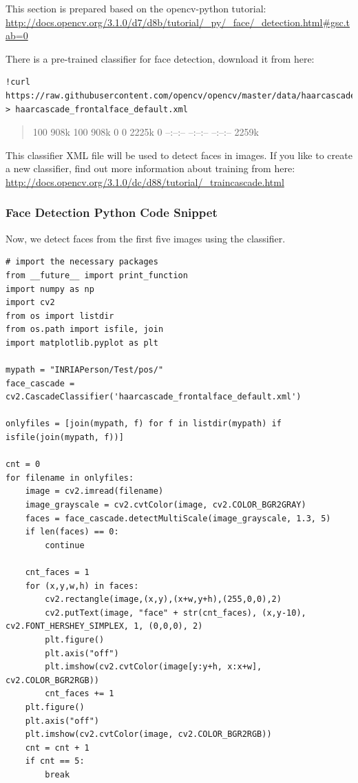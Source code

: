 This section is prepared based on the opencv-python tutorial:
\url{http://docs.opencv.org/3.1.0/d7/d8b/tutorial/_py/_face/_detection.html\#gsc.tab=0}

There is a pre-trained classifier for face detection, download it from
here:

\begin{verbatim}
!curl https://raw.githubusercontent.com/opencv/opencv/master/data/haarcascades/haarcascade_frontalface_default.xml > haarcascade_frontalface_default.xml
\end{verbatim}

\begin{quote}
100 908k 100 908k 0 0 2225k 0 --:--:-- --:--:-- --:--:-- 2259k
\end{quote}

This classifier XML file will be used to detect faces in images. If you
like to create a new classifier, find out more information about
training from here:
\url{http://docs.opencv.org/3.1.0/dc/d88/tutorial/_traincascade.html}

\subsubsection{Face Detection Python Code
Snippet}\label{face-detection-python-code-snippet}

Now, we detect faces from the first five images using the classifier.

\begin{verbatim}
# import the necessary packages
from __future__ import print_function
import numpy as np
import cv2
from os import listdir
from os.path import isfile, join
import matplotlib.pyplot as plt

mypath = "INRIAPerson/Test/pos/"
face_cascade = cv2.CascadeClassifier('haarcascade_frontalface_default.xml')

onlyfiles = [join(mypath, f) for f in listdir(mypath) if isfile(join(mypath, f))]

cnt = 0
for filename in onlyfiles:
    image = cv2.imread(filename)
    image_grayscale = cv2.cvtColor(image, cv2.COLOR_BGR2GRAY)
    faces = face_cascade.detectMultiScale(image_grayscale, 1.3, 5)
    if len(faces) == 0:
        continue

    cnt_faces = 1
    for (x,y,w,h) in faces:
        cv2.rectangle(image,(x,y),(x+w,y+h),(255,0,0),2)
        cv2.putText(image, "face" + str(cnt_faces), (x,y-10), cv2.FONT_HERSHEY_SIMPLEX, 1, (0,0,0), 2)
        plt.figure()
        plt.axis("off")
        plt.imshow(cv2.cvtColor(image[y:y+h, x:x+w], cv2.COLOR_BGR2RGB))
        cnt_faces += 1
    plt.figure()
    plt.axis("off")
    plt.imshow(cv2.cvtColor(image, cv2.COLOR_BGR2RGB))        
    cnt = cnt + 1
    if cnt == 5:
        break
\end{verbatim}


